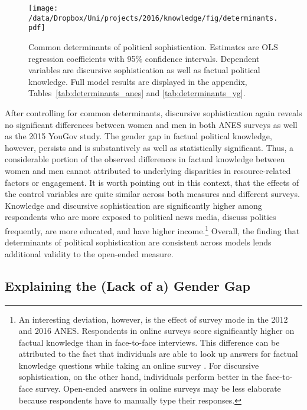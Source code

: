 \begin{figure}[h]\centering
\texttt{[image: /data/Dropbox/Uni/projects/2016/knowledge/fig/determinants.pdf]}
\caption[Common determinants of political sophistication]{Common determinants of political sophistication. Estimates are OLS regression coefficients with 95\% confidence intervals. Dependent variables are discursive sophistication as well as factual political knowledge. Full model results are displayed in the appendix, Tables~\ref{tab:determinants_anes} and \ref{tab:determinants_yg}.}\label{fig:determinants}
\end{figure}

After controlling for common determinants, discursive sophistication again reveals no significant differences between women and men in both ANES surveys as well as the 2015 YouGov study. The gender gap in factual political knowledge, however, persists and is substantively as well as statistically significant. Thus, a considerable portion of the observed differences in factual knowledge between women and men cannot attributed to underlying disparities in resource-related factors or engagement. It is worth pointing out in this context, that the effects of the control variables are quite similar across both measures and different surveys. Knowledge and discursive sophistication are significantly higher among respondents who are more exposed to political news media, discuss politics frequently, are more educated, and have higher income.\footnote{An interesting deviation, however, is the effect of survey mode in the 2012 and 2016 ANES. Respondents in online surveys score significantly higher on factual knowledge than in face-to-face interviews. This difference can be attributed to the fact that individuals are able to look up answers for factual knowledge questions while taking an online survey \citep[cf.][]{clifford2016cheating}. For discursive sophistication, on the other hand, individuals perform better in the face-to-face survey. Open-ended answers in online surveys may be less elaborate because respondents have to manually type their responses.} Overall, the finding that determinants of political sophistication are consistent across models lends additional validity to the open-ended measure.


\subsection*{Explaining the (Lack of a) Gender Gap}

